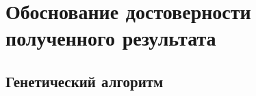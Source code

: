 \documentclass[10pt,a4paper,titlepage]{article}
\begin{document}

\section{Обоснование достоверности полученного результата}

\subsection{Генетический алгоритм}
\end{document}
